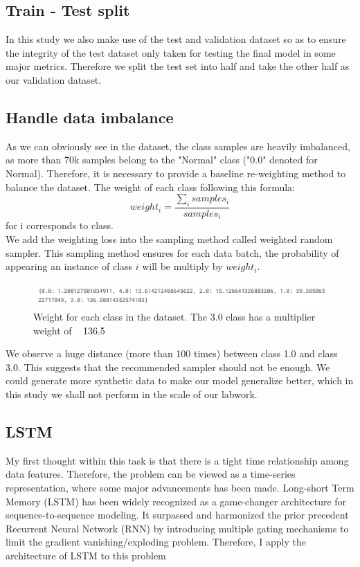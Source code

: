 \documentclass[a4paper,12pt]{article}
\begin{document}
\subsection{Train - Test split}
In this study we also make use of the test and validation dataset so as to ensure the integrity of the test dataset only taken for testing the final model in some major metrics. Therefore we split the test set into half and take the other half as our validation dataset.

\subsection{Handle data imbalance}
As we can obviously see in the dataset, the class samples are heavily imbalanced, as more than 70k samples belong to the "Normal" class ("0.0" denoted for Normal). Therefore, it is necessary to provide a baseline re-weighting method to balance the dataset. The weight of each class following this formula:
$$ weight_i = \frac{\sum_isamples_i}{samples_i}$$ for i corresponds to class.\\
We add the weighting loss into the sampling method called weighted random sampler. This sampling method ensures for each data batch, the probability of appearing an instance of class $i$ will be multiply by $weight_i$. 
\begin{figure}[h!]
    \centering
    \includegraphics[width=1\linewidth]{imbalance.png}
    \caption{Weight for each class in the dataset. The 3.0 class has a multiplier weight of ~ 136.5}
    \label{fig:fig4}
\end{figure}
We observe a huge distance (more than 100 times) between class 1.0 and class 3.0. This suggests that the recommended sampler should not be enough. We could generate more synthetic data to make our model generalize better, which in this study we shall not perform in the scale of our labwork.

\subsection{LSTM}
My first thought within this task is that there is a tight time relationship among data features. Therefore, the problem can be viewed as a time-series representation, where some major advancements has been made. Long-short Term Memory (LSTM) \cite{6795963} has been widely recognized as a game-changer architecture for sequence-to-sequence modeling. It surpassed and harmonized the prior precedent Recurrent Neural Network (RNN) by introducing multiple gating mechanisms to limit the gradient vanishing/exploding problem. Therefore, I apply the architecture of LSTM to this problem
\end{document}
